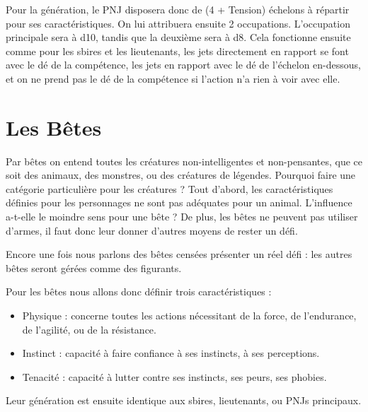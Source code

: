 \documentclass{conf/FusinaClass}
\begin{document}
Pour la génération, le PNJ disposera donc de (4 + Tension) échelons à répartir pour ses caractéristiques. On lui attribuera ensuite 2 occupations. L'occupation principale sera à d10, tandis que la deuxième sera à d8. Cela fonctionne ensuite comme pour les sbires et les lieutenants, les jets directement en rapport se font avec le dé de la compétence, les jets en rapport avec le dé de l'échelon en-dessous, et on ne prend pas le dé de la compétence si l'action n'a rien à voir avec elle.

\section{Les Bêtes}
Par bêtes on entend toutes les créatures non-intelligentes et non-pensantes, que ce soit des animaux, des monstres, ou des créatures de légendes. Pourquoi faire une catégorie particulière pour les créatures ? Tout d'abord, les caractéristiques définies pour les personnages ne sont pas adéquates pour un animal. L'influence a-t-elle le moindre sens pour une bête ? De plus, les bêtes ne peuvent pas utiliser d'armes, il faut donc leur donner d'autres moyens de rester un défi.

Encore une fois nous parlons des bêtes censées présenter un réel défi : les autres bêtes seront gérées comme des figurants. 

Pour les bêtes nous allons donc définir trois caractéristiques :

\begin{itemize}
\item Physique : concerne toutes les actions nécessitant de la force, de l'endurance, de l'agilité, ou de la résistance.
\item Instinct : capacité à faire confiance à ses instincts, à ses perceptions.
\item Tenacité : capacité à lutter contre ses instincts, ses peurs, ses phobies. 
\end{itemize}

Leur génération est ensuite identique aux sbires, lieutenants, ou PNJs principaux.
\end{document}
